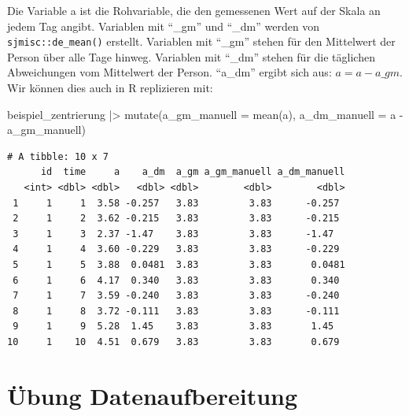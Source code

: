\documentclass[
  letterpaper,
  DIV=11,
  numbers=noendperiod]{scrreprt}
\newenvironment{Shaded}{\begin{snugshade}}{\end{snugshade}}
\newcommand{\AttributeTok}[1]{\textcolor[rgb]{0.40,0.45,0.13}{#1}}
\newcommand{\FunctionTok}[1]{\textcolor[rgb]{0.28,0.35,0.67}{#1}}
\newcommand{\NormalTok}[1]{\textcolor[rgb]{0.00,0.23,0.31}{#1}}
\newcommand{\SpecialCharTok}[1]{\textcolor[rgb]{0.37,0.37,0.37}{#1}}
\begin{document}
\begin{tcolorbox}[enhanced jigsaw, toprule=.15mm, breakable, arc=.35mm, opacitybacktitle=0.6, titlerule=0mm, rightrule=.15mm, title=\textcolor{quarto-callout-tip-color}{\faLightbulb}\hspace{0.5em}{Lösung}, colbacktitle=quarto-callout-tip-color!10!white, coltitle=black, bottomrule=.15mm, colframe=quarto-callout-tip-color-frame, bottomtitle=1mm, toptitle=1mm, leftrule=.75mm, left=2mm, opacityback=0, colback=white]

Die Variable a ist die Rohvariable, die den gemessenen Wert auf der
Skala an jedem Tag angibt. Variablen mit ``\_gm'' und ``\_dm'' werden
von \texttt{sjmisc::de\_mean()} erstellt. Variablen mit ``\_gm'' stehen
für den Mittelwert der Person über alle Tage hinweg. Variablen mit
``\_dm'' stehen für die täglichen Abweichungen vom Mittelwert der
Person. ``a\_dm'' ergibt sich aus: \(a = a - a\_gm\). Wir können dies
auch in R replizieren mit:

\begin{Shaded}
\begin{Highlighting}[]
\NormalTok{beispiel\_zentrierung }\SpecialCharTok{|\textgreater{}} 
  \FunctionTok{mutate}\NormalTok{(}\AttributeTok{a\_gm\_manuell =} \FunctionTok{mean}\NormalTok{(a),}
         \AttributeTok{a\_dm\_manuell =}\NormalTok{ a }\SpecialCharTok{{-}}\NormalTok{ a\_gm\_manuell)}
\end{Highlighting}
\end{Shaded}

\begin{verbatim}
# A tibble: 10 x 7
      id  time     a    a_dm  a_gm a_gm_manuell a_dm_manuell
   <int> <dbl> <dbl>   <dbl> <dbl>        <dbl>        <dbl>
 1     1     1  3.58 -0.257   3.83         3.83      -0.257 
 2     1     2  3.62 -0.215   3.83         3.83      -0.215 
 3     1     3  2.37 -1.47    3.83         3.83      -1.47  
 4     1     4  3.60 -0.229   3.83         3.83      -0.229 
 5     1     5  3.88  0.0481  3.83         3.83       0.0481
 6     1     6  4.17  0.340   3.83         3.83       0.340 
 7     1     7  3.59 -0.240   3.83         3.83      -0.240 
 8     1     8  3.72 -0.111   3.83         3.83      -0.111 
 9     1     9  5.28  1.45    3.83         3.83       1.45  
10     1    10  4.51  0.679   3.83         3.83       0.679 
\end{verbatim}

\end{tcolorbox}

\section{Übung Datenaufbereitung}\label{uxfcbung-datenaufbereitung}
\end{document}
